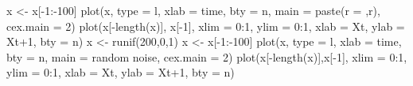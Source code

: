 \documentclass[
  a4paper,
  DIV=11,
  numbers=noendperiod,
  oneside]{scrreprt}
\newenvironment{Shaded}{}{}
\newcommand{\AttributeTok}[1]{\textcolor[rgb]{0.84,0.23,0.29}{#1}}
\newcommand{\DecValTok}[1]{\textcolor[rgb]{0.00,0.36,0.77}{#1}}
\newcommand{\FunctionTok}[1]{\textcolor[rgb]{0.44,0.26,0.76}{#1}}
\newcommand{\NormalTok}[1]{\textcolor[rgb]{0.14,0.16,0.18}{#1}}
\newcommand{\OtherTok}[1]{\textcolor[rgb]{0.44,0.26,0.76}{#1}}
\newcommand{\SpecialCharTok}[1]{\textcolor[rgb]{0.00,0.36,0.77}{#1}}
\newcommand{\StringTok}[1]{\textcolor[rgb]{0.01,0.18,0.38}{#1}}
\begin{document}
\begin{Shaded}
\begin{Highlighting}[]
\NormalTok{x }\OtherTok{\textless{}{-}}\NormalTok{ x[}\SpecialCharTok{{-}}\DecValTok{1}\SpecialCharTok{:{-}}\DecValTok{100}\NormalTok{]}
\FunctionTok{plot}\NormalTok{(x, }\AttributeTok{type =} \StringTok{\textquotesingle{}l\textquotesingle{}}\NormalTok{, }\AttributeTok{xlab =} \StringTok{\textquotesingle{}time\textquotesingle{}}\NormalTok{, }\AttributeTok{bty =} \StringTok{\textquotesingle{}n\textquotesingle{}}\NormalTok{,}
     \AttributeTok{main =} \FunctionTok{paste}\NormalTok{(}\StringTok{\textquotesingle{}r = \textquotesingle{}}\NormalTok{,r), }\AttributeTok{cex.main =} \DecValTok{2}\NormalTok{) }
\FunctionTok{plot}\NormalTok{(x[}\SpecialCharTok{{-}}\FunctionTok{length}\NormalTok{(x)], x[}\SpecialCharTok{{-}}\DecValTok{1}\NormalTok{], }\AttributeTok{xlim =} \DecValTok{0}\SpecialCharTok{:}\DecValTok{1}\NormalTok{, }\AttributeTok{ylim =} \DecValTok{0}\SpecialCharTok{:}\DecValTok{1}\NormalTok{, }
     \AttributeTok{xlab =} \StringTok{\textquotesingle{}Xt\textquotesingle{}}\NormalTok{, }\AttributeTok{ylab =} \StringTok{\textquotesingle{}Xt+1\textquotesingle{}}\NormalTok{, }\AttributeTok{bty =} \StringTok{\textquotesingle{}n\textquotesingle{}}\NormalTok{)}
\NormalTok{x }\OtherTok{\textless{}{-}} \FunctionTok{runif}\NormalTok{(}\DecValTok{200}\NormalTok{,}\DecValTok{0}\NormalTok{,}\DecValTok{1}\NormalTok{)}
\NormalTok{x }\OtherTok{\textless{}{-}}\NormalTok{ x[}\SpecialCharTok{{-}}\DecValTok{1}\SpecialCharTok{:{-}}\DecValTok{100}\NormalTok{]}
\FunctionTok{plot}\NormalTok{(x, }\AttributeTok{type =} \StringTok{\textquotesingle{}l\textquotesingle{}}\NormalTok{, }\AttributeTok{xlab =} \StringTok{\textquotesingle{}time\textquotesingle{}}\NormalTok{, }\AttributeTok{bty =} \StringTok{\textquotesingle{}n\textquotesingle{}}\NormalTok{,}
     \AttributeTok{main =} \StringTok{\textquotesingle{}random noise\textquotesingle{}}\NormalTok{,}
     \AttributeTok{cex.main =} \DecValTok{2}\NormalTok{) }
\FunctionTok{plot}\NormalTok{(x[}\SpecialCharTok{{-}}\FunctionTok{length}\NormalTok{(x)],x[}\SpecialCharTok{{-}}\DecValTok{1}\NormalTok{], }\AttributeTok{xlim =} \DecValTok{0}\SpecialCharTok{:}\DecValTok{1}\NormalTok{, }\AttributeTok{ylim =} \DecValTok{0}\SpecialCharTok{:}\DecValTok{1}\NormalTok{, }
     \AttributeTok{xlab =} \StringTok{\textquotesingle{}Xt\textquotesingle{}}\NormalTok{, }\AttributeTok{ylab =} \StringTok{\textquotesingle{}Xt+1\textquotesingle{}}\NormalTok{, }\AttributeTok{bty =} \StringTok{\textquotesingle{}n\textquotesingle{}}\NormalTok{)}
\end{Highlighting}
\end{Shaded}
\end{document}
